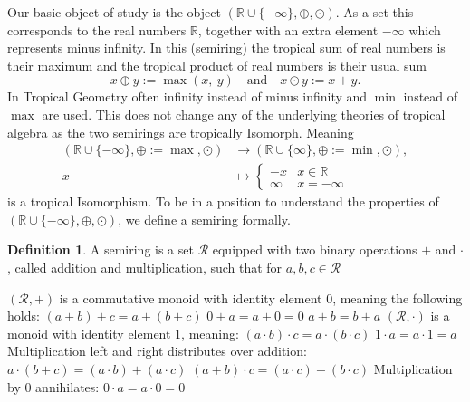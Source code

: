 \documentclass{article}
\theoremstyle{definition}
\newtheorem{definition}[theorem]{Definition}
\begin{document}
Our basic object of study is the object $( \mathbb{R} \cup \{- \infty \} , \oplus , \odot )$. As a set this corresponds to the real numbers $ \mathbb{R} $, together with an extra element $- \infty $ which represents minus infinity. In this (semiring) the tropical sum of real numbers is their maximum and the tropical product of real numbers is their usual sum 
$$ x \oplus y := \max(x,\ y) \quad \text{and} \quad x \odot y := x+y.$$
In Tropical Geometry often infinity instead of minus infinity and $\min$ instead of $\max$ are used. This does not change any of the underlying theories of tropical algebra as the two semirings are tropically Isomorph. Meaning 
\begin{align*}
( \mathbb{R} \cup \{- \infty \} , \oplus := \max, \odot ) &\to ( \mathbb{R} \cup \{ \infty \} , \oplus := \min , \odot ), \\
x &\mapsto \begin{cases} -x & x \in \mathbb{R}\\
\infty & x = - \infty
\end{cases}
\end{align*}
is a tropical Isomorphism. To be in a position to understand the properties of $( \mathbb{R} \cup \{- \infty \} , \oplus , \odot )$, we define a semiring formally.
\begin{definition}
A semiring is a set $\mathcal{R}$ equipped with two binary operations $+$ and $\cdot$ , called addition and multiplication, such that for $a, b, c \in \mathcal{R}$ \cite{berstel1985theory} \\
\begin{outline}
  \1 $(\mathcal{R}, +)$ is a commutative monoid with identity element 0, meaning the following holds:
    \2 $(a + b) + c = a + (b + c)$
    \2 $0 + a = a + 0 = 0$
    \2 $a + b = b + a$
  \1 $(\mathcal{R}, \cdot)$ is a monoid with identity element $1$, meaning:
    \2 $(a \cdot b) \cdot c = a \cdot (b \cdot c)$
    \2 $ 1 \cdot a = a \cdot 1 = a $
  \1 Multiplication left and right distributes over addition:
    \2 $ a \cdot (b + c) = (a \cdot b) + (a \cdot c)$
    \2 $ (a + b) \cdot c = (a \cdot c) + (b \cdot c)$
  \1 Multiplication by 0 annihilates:
    \2 $ 0 \cdot a = a \cdot 0 = 0$
\end{outline}
\end{definition}
\end{document}
